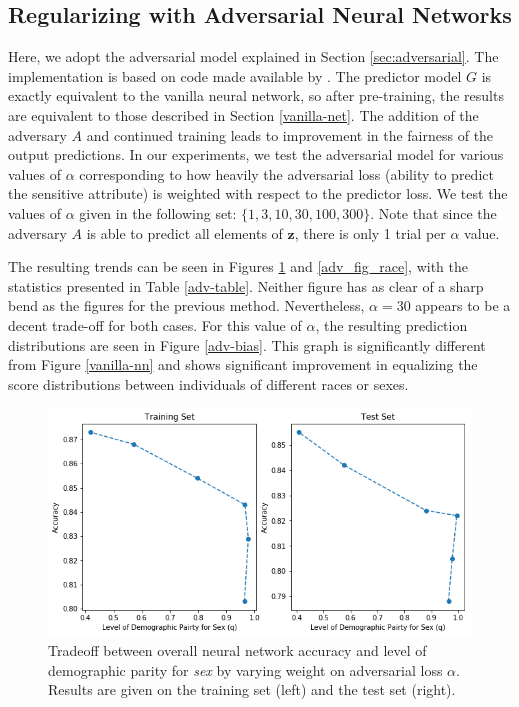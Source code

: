 \documentclass{article}
\newcommand{\bd}[1]{\boldsymbol{#1}}
\begin{document}
\subsection{Regularizing with Adversarial Neural Networks}
Here, we adopt the adversarial model explained in Section \ref{sec:adversarial}. The implementation is based on code made available by \cite{fairness-in-ml}. The predictor model $G$ is exactly equivalent to the vanilla neural network, so after pre-training, the results are equivalent to those described in Section \ref{vanilla-net}. The addition of the adversary $A$ and continued training leads to improvement in the fairness of the output predictions. In our experiments, we test the adversarial model for various values of $\alpha$ corresponding to how heavily the adversarial loss (ability to predict the sensitive attribute) is weighted with respect to the predictor loss. We test the values of $\alpha$ given in the following set: $\{1, 3, 10, 30, 100, 300 \}$. Note that since the adversary $A$ is able to predict all elements of $\bd z$, there is only 1 trial per $\alpha$ value. 

The resulting trends can be seen in Figures \ref{adv_fig_sex} and \ref{adv_fig_race}, with the statistics presented in Table \ref{adv-table}. Neither figure has as clear of a sharp bend as the figures for the previous method. Nevertheless, $\alpha=30$ appears to be a decent trade-off for both cases. For this value of $\alpha$, the resulting prediction distributions are seen in Figure \ref{adv-bias}. This graph is significantly different from Figure \ref{vanilla-nn} and shows significant improvement in equalizing the score distributions between individuals of different races or sexes. 

\begin{figure}[ht]
	\vskip 0.2in
	\begin{center}
		\centerline{\includegraphics[width=\columnwidth]{img/adv_levels_sex.png}}
		\caption{Tradeoff between overall neural network accuracy and level of demographic parity for \emph{sex} by varying weight on adversarial loss $\alpha$. Results are given on the training set (left) and the test set (right).}
		\label{adv_fig_sex}
	\end{center}
	\vskip -0.2in
\end{figure}
\end{document}
